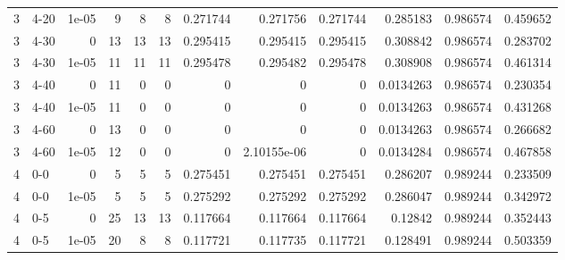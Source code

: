 \begin{tabular}{rlrrrrrrrrrr}
     3 & 4-20   &      1e-05 &           9 &                 8 &                 8 &     0.271744    &     0.271756    &      0.271744    &        0.285183  &               0.986574 &           0.459652 \\
     3 & 4-30   &      0     &          13 &                13 &                13 &     0.295415    &     0.295415    &      0.295415    &        0.308842  &               0.986574 &           0.283702 \\
     3 & 4-30   &      1e-05 &          11 &                11 &                11 &     0.295478    &     0.295482    &      0.295478    &        0.308908  &               0.986574 &           0.461314 \\
     3 & 4-40   &      0     &          11 &                 0 &                 0 &     0           &     0           &      0           &        0.0134263 &               0.986574 &           0.230354 \\
     3 & 4-40   &      1e-05 &          11 &                 0 &                 0 &     0           &     0           &      0           &        0.0134263 &               0.986574 &           0.431268 \\
     3 & 4-60   &      0     &          13 &                 0 &                 0 &     0           &     0           &      0           &        0.0134263 &               0.986574 &           0.266682 \\
     3 & 4-60   &      1e-05 &          12 &                 0 &                 0 &     0           &     2.10155e-06 &      0           &        0.0134284 &               0.986574 &           0.467858 \\
     4 & 0-0    &      0     &           5 &                 5 &                 5 &     0.275451    &     0.275451    &      0.275451    &        0.286207  &               0.989244 &           0.233509 \\
     4 & 0-0    &      1e-05 &           5 &                 5 &                 5 &     0.275292    &     0.275292    &      0.275292    &        0.286047  &               0.989244 &           0.342972 \\
     4 & 0-5    &      0     &          25 &                13 &                13 &     0.117664    &     0.117664    &      0.117664    &        0.12842   &               0.989244 &           0.352443 \\
     4 & 0-5    &      1e-05 &          20 &                 8 &                 8 &     0.117721    &     0.117735    &      0.117721    &        0.128491  &               0.989244 &           0.503359 \\

\end{tabular}
